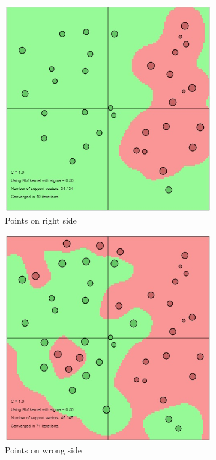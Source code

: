 {     
	\begin{figure}[ht] 
		\centering
	 	\begin{subfigure}{.3\textwidth}
	 		\centering
	 		\includegraphics[width=.7\linewidth]{Exercise1/Report/RBF_kernel_1.jpg}
	 		\caption{Points on right side}
	 		\label{fig:rbf1}
	 	\end{subfigure}
		 \begin{subfigure}{.3\textwidth}
	 		\centering
	 		\includegraphics[width=.7\linewidth]{Exercise1/Report/RBF_kernel_2.jpg}
	 		\caption{Points on wrong side}
	 		\label{fig:rbf2}
	 	\end{subfigure}
	 	\begin{subfigure}{.3\textwidth}
 			\centering

\end{subfigure}
\end{figure}}
